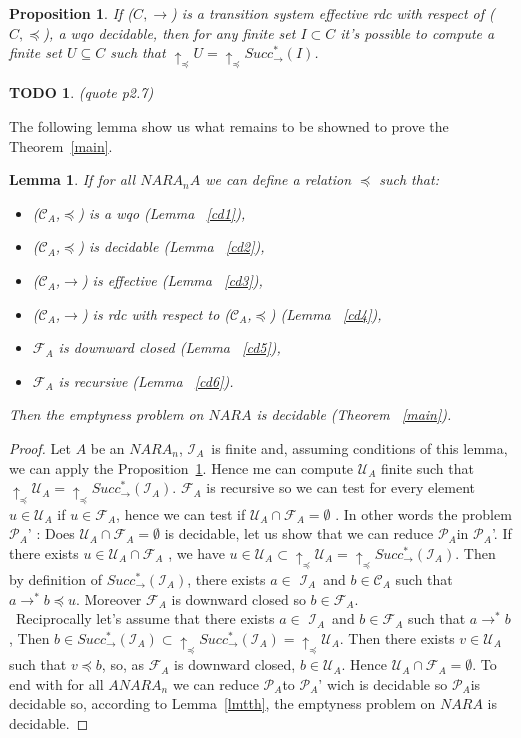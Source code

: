 \documentclass[a4paper,10pt]{report}
\newtheorem{lm}{Lemma}[thr]
\newtheorem{pp}{Proposition}
\newtheorem{td}{TODO}
\newcommand{\C}{\mathcal{C}_{A}}
\newcommand{\I}{\mathcal{I}_{A}}
\newcommand{\F}{\mathcal{F}_{A}}
\newcommand{\U}{\mathcal{U}_{A}}
\newcommand{\pb}{$\mathcal{P}_{A}$}
\begin{document}
\begin{pp} 
  \label{pp}
  If  ($C,\rightarrow$) is a transition system effective rdc with respect of ($C,\preceq$), a wqo decidable, then for any finite set $I\subset C$ it's possible to compute a finite set $U \subseteq C$ such that
  $\uparrow_\preceq U=\uparrow_\preceq Succ^*_\rightarrow (I)$.
\end{pp}

\begin{td}
  (quote p2.7)
\end{td}

The following lemma show us what remains to be showned to prove the Theorem~\ref{main}.
\begin{lm}
    \label{mlm}
    If for all $NARA_nA$ we can define a relation $\preceq$ such that: 
     \begin{itemize}
	\item ($\C$,$\preceq$) is a wqo (Lemma ~\ref{cd1}),
	\item ($\C$,$\preceq$) is decidable (Lemma ~\ref{cd2}),
	\item ($\C$,$\rightarrow$) is effective (Lemma ~\ref{cd3}),
	\item ($\C$,$\rightarrow$) is rdc with respect to ($\C$,$\preceq$) (Lemma ~\ref{cd4}),
	\item $\F$ is downward closed (Lemma ~\ref{cd5}),
	\item $\F$ is recursive (Lemma ~\ref{cd6}).
     \end{itemize}
      Then the emptyness problem on $NARA$ is decidable (Theorem ~\ref{main}).
\end{lm}

\begin{proof}
  Let $A$ be an $NARA_n$,
  $\I$\ is finite and, assuming conditions of this lemma, we can apply the Proposition~\ref{pp}.
  Hence me can compute $\U$ finite such that $\uparrow_\preceq \U=\uparrow_\preceq Succ^*_\rightarrow (\I)$.
  $\F$ is recursive so we can test for every element $u \in \U$ if $u \in\F$, hence we can test if $\U \cap\F=\emptyset$ . 
  In other words the problem \pb' : Does $\U \cap \F =\emptyset$ is decidable, let us show that we can reduce \pb in \pb'.  
  If there exists $u \in \U \cap \F$ , we have $u\in \U \subset \uparrow_\preceq  \U =\uparrow_\preceq Succ^*_\rightarrow (\I)$. 
  Then by definition of $Succ^*_\rightarrow (\I)$, there exists $a\in$ $\I$\ and $b \in\C$ such that $a \rightarrow^* b \preceq u$.
  Moreover $\F$ is downward closed so $b \in \F$.\\\
  Reciprocally let's assume that there exists $a\in$ $\I$\ and $b \in\F$ such that $a \rightarrow^* b $,
  Then $b \in  Succ^*_\rightarrow (\I) \subset \uparrow_\preceq Succ^*_\rightarrow (\I)=\uparrow_\preceq  \U$. 
  Then there exists $v \in \U$ such that $v \preceq b$, so, as $\F$ is downward closed, $b \in \U$. Hence $\U \cap \F =\emptyset$.
  To end with for all $ANARA_n$ we can reduce \pb to \pb' wich is decidable so \pb is decidable so, according to Lemma~\ref{lmtth},  the emptyness problem on $NARA$ is decidable.
\end{proof}
\end{document}
